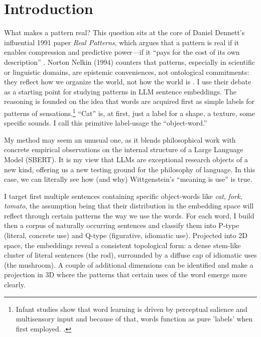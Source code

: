 \documentclass[12pt]{article}
\begin{document}
\setcounter{tocdepth}{3}
\section{Introduction}\label{introduction}

What makes a pattern real? This question sits at the core of Daniel Dennett's influential 1991 paper \emph{Real Patterns}, which argues that a pattern is real if it enables compression and predictive power---if it ``pays for the cost of its own description'' \cite{ref-dennettRealPatterns1991}. Norton Nelkin (1994) counters that patterns, especially in scientific or linguistic domains, are epistemic conveniences, not ontological commitments: they reflect how we organize the world, not how the world is \cite{ref-nelkinPatterns1994}. I use their debate as a starting point for studying patterns in LLM sentence embeddings. The reasoning is founded on the idea that words are acquired first as simple labels for patterns of sensations.\footnote{Infant studies show that word learning is driven by perceptual salience and multisensory input and because of that, words function as pure 'labels' when first employed. \cite{ref-hollichBreaking2000,ref-prudenBirth2006,ref-seidlTouch2024}.} ``Cat'' is, at first, just a label for a shape, a texture, some specific sounds. I call this primitive label-usage the ``object-word.''

My method may seem an unusual one, as it blends philosophical work with concrete empirical observations on the internal structure of a Large Language Model (SBERT). It is my view that LLMs are exceptional research objects of a new kind, offering us a new testing ground for the philosophy of language. In this case, we can literally see how (and why) Wittgenstein's ``meaning is use'' is true.

I target first multiple sentences containing specific object-words like \emph{cat}, \emph{fork}, \emph{tomato}, the assumption being that their distribution in the embedding space will reflect through certain patterns the way we use the words. For each word, I build then a corpus of naturally occurring sentences and classify them into P-type (literal, concrete use) and Q-type (figurative, idiomatic use). Projected into 2D space, the embeddings reveal a consistent topological form: a dense stem-like cluster of literal sentences (the rod), surrounded by a diffuse cap of idiomatic uses (the mushroom). A couple of additional dimensions can be identified and make a projection in 3D where the patterns that certain uses of the word emerge more clearly.
\end{document}
